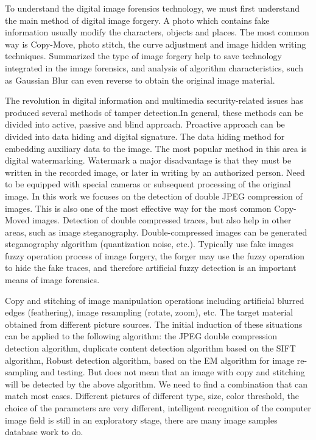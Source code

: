 \documentclass[a4paper, 10pt, notitlepage]{report}
\begin{document}
	To understand the digital image forensics technology, we must first understand the main method of digital image forgery. A photo which contains fake information usually modify the characters, objects and places. The most common way is Copy-Move, photo stitch, the curve adjustment and image hidden writing techniques. Summarized the type of image forgery help to save technology integrated in the image forensics, and analysis of algorithm characteristics, such as Gaussian Blur can even reverse to obtain the original image material.

	The revolution in digital information and multimedia security-related issues has produced several methods of tamper detection.In general, these methods can be divided into active, passive and blind approach. Proactive approach can be divided into data hiding and digital signature. The data hiding method for embedding auxiliary data to the image. The most popular method in this area is digital watermarking. Watermark a major disadvantage is that they must be written in the recorded image, or later in writing by an authorized person. Need to be equipped with special cameras or subsequent processing of the original image. In this work we focuses on the detection of double JPEG compression of images. This is also one of the most effective way for the most common Copy-Moved images. Detection of double compressed traces, but also help in other areas, such as image steganography. Double-compressed images can be generated steganography algorithm (quantization noise, etc.). Typically use fake images fuzzy operation process of image forgery, the forger may use the fuzzy operation to hide the fake traces, and therefore artificial fuzzy detection is an important means of image forensics.

	Copy and stitching of image manipulation operations including artificial blurred edges (feathering), image resampling (rotate, zoom), etc. The target material obtained from different picture sources. The initial induction of these situations can be applied to the following algorithm: the JPEG double compression detection algorithm, duplicate content detection algorithm based on the SIFT algorithm, Robust detection algorithm, based on the EM algorithm for image re-sampling and testing. But does not mean that an image with copy and stitching will be detected  by the above algorithm. We need to find a combination that can match most cases. Different pictures of different type, size, color threshold, the choice of the parameters are very different, intelligent recognition of the computer image field is still in an exploratory stage, there are many image samples database work to do.
\end{document}
